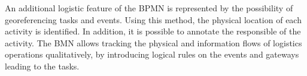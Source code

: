 An additional logistic feature of the BPMN is represented by the possibility of georeferencing tasks and events. Using this method, the physical location of each activity is identified. In addition, it is possible to annotate the responsible of the activity. The BMN allows tracking the physical and information flows of logistics operations qualitatively, by introducing logical rules on the events and gateways leading to the tasks.



